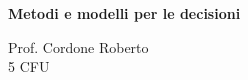 \documentclass[\main/main.tex]{subfiles}
\begin{document}
\begin{titlepage}
    \begin{center}
        \vspace*{1em}
        
        \textbf{\large{Metodi e modelli per le decisioni}}
        
        \vspace{1em}
        Prof. Cordone Roberto
        \\
        \small{5 CFU}
        \vspace{1em}
        
		 
        
    \end{center}
\end{titlepage}
\end{document}
